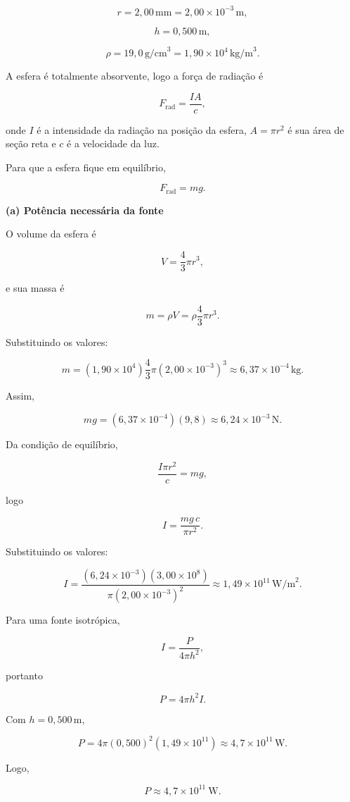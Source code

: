 \documentclass[12pt,a4paper]{article}
\begin{document}
\[
r = 2,00\,\text{mm} = 2,00\times10^{-3}\,\text{m},
\]

\[
h = 0,500\,\text{m},
\]

\[
\rho = 19,0\,\text{g/cm}^3
      = 1,90\times10^{4}\,\text{kg/m}^3.
\]

A esfera é totalmente absorvente, logo a força de radiação é

\[
F_{\text{rad}}=\frac{IA}{c},
\]

onde \(I\) é a intensidade da radiação na posição da esfera,
\(A=\pi r^2\) é sua área de seção reta e \(c\) é a velocidade da luz.

Para que a esfera fique em equilíbrio,

\[
F_{\text{rad}}=mg.
\]

\bigskip

\textbf{(a) Potência necessária da fonte}

O volume da esfera é

\[
V=\frac{4}{3}\pi r^3,
\]

e sua massa é

\[
m=\rho V
  =\rho\frac{4}{3}\pi r^3.
\]

Substituindo os valores:

\[
m
=(1,90\times10^{4})
\frac{4}{3}\pi(2,00\times10^{-3})^3
\approx 6,37\times10^{-4}\,\text{kg}.
\]

Assim,

\[
mg
=(6,37\times10^{-4})(9,8)
\approx 6,24\times10^{-3}\,\text{N}.
\]

Da condição de equilíbrio,

\[
\frac{I\pi r^2}{c}=mg,
\]

logo

\[
I=\frac{mg\,c}{\pi r^2}.
\]

Substituindo os valores:

\[
I=
\frac{(6,24\times10^{-3})(3,00\times10^{8})}
{\pi(2,00\times10^{-3})^2}
\approx 1,49\times10^{11}\,\text{W/m}^2.
\]

Para uma fonte isotrópica,

\[
I=\frac{P}{4\pi h^2},
\]

portanto

\[
P=4\pi h^2 I.
\]

Com \(h=0,500\,\text{m}\),

\[
P
=4\pi(0,500)^2(1,49\times10^{11})
\approx 4,7\times10^{11}\,\text{W}.
\]

Logo,

\[
\boxed{P \approx 4,7\times10^{11}\ \text{W}}.
\]
\end{document}
